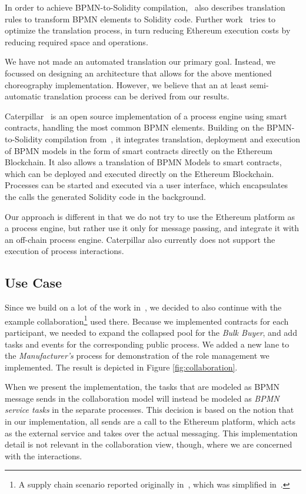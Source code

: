 \documentclass[runningheads]{llncs}
\begin{document}
In order to achieve BPMN-to-Solidity compilation,~\cite{weber2016untrusted} also describes translation rules to transform BPMN elements to Solidity code.
Further work~\cite{banuelos2017optimized} tries to optimize the translation process, in turn reducing Ethereum execution costs by reducing required space and operations.

We have not made an automated translation our primary goal.
Instead, we focussed on designing an architecture that allows for the above mentioned choreography implementation.
However, we believe that an at least semi-automatic translation process can be derived from our results.

Caterpillar~\cite{lopez2017caterpillar} is an open source implementation of a process engine using smart contracts, handling the most common BPMN elements.
Building on the BPMN-to-Solidity compilation from~\cite{weber2016untrusted}, it integrates translation, deployment and execution of BPMN models in the form of smart contracts directly on the Ethereum Blockchain.
It also allows a translation of BPMN Models to smart contracts, which can be deployed and executed directly on the Ethereum Blockchain.
Processes can be started and executed via a user interface, which encapsulates the calls the generated Solidity code in the background.

Our approach is different in that we do not try to use the Ethereum platform as a process engine, but rather use it only for message passing, and integrate it with an off-chain process engine.
Caterpillar also currently does not support the execution of process interactions.

\subsection{Use Case}

Since we build on a lot of the work in~\cite{weber2016untrusted}, we decided to also continue with the example collaboration\footnote{A supply chain scenario reported originally in~\cite{fdhila2015collaborative}, which was simplified in~\cite{weber2016untrusted}.} used there.
Because we implemented contracts for each participant, we needed to expand the collapsed pool for the \emph{Bulk Buyer}, and add tasks and events for the corresponding public process.
We added a new lane to the \emph{Manufacturer's} process for demonstration of the role management we implemented.
The result is depicted in Figure \ref{fig:collaboration}.

When we present the implementation, the tasks that are modeled as BPMN message sends in the collaboration model will instead be modeled as \emph{BPMN service tasks} in the separate processes.
This decision is based on the notion that in our implementation, all sends are a call to the Ethereum platform, which acts as the external service and takes over the actual messaging.
This implementation detail is not relevant in the collaboration view, though, where we are concerned with the interactions.
\end{document}
